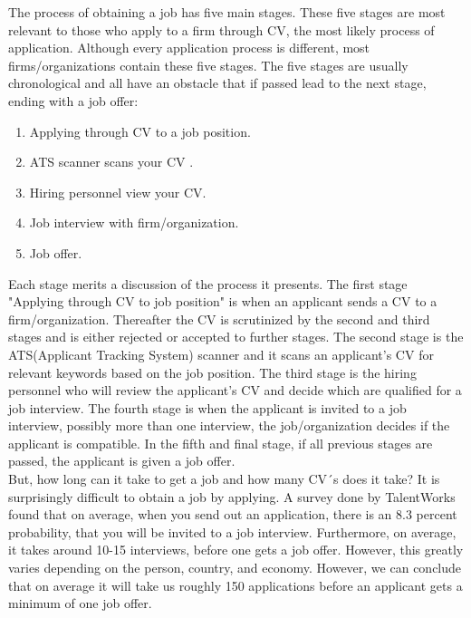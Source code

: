 The process of obtaining a job has five main stages.
These five stages are most relevant to those who apply to a firm through CV, the most likely process of application.
Although every application process is different, most firms/organizations contain these five stages.
The five stages are usually chronological and all have an obstacle that if passed lead to the next stage, ending with a job offer:
\begin{enumerate} 
   \item Applying through CV to a job position.
   \item ATS scanner scans your CV \cite{ATS-scanner}.
   \item Hiring personnel view your CV.
   \item Job interview with firm/organization.
   \item Job offer.\cite{Process_steps_unemployment}
\end{enumerate} \label{Five_stages_of_obtaining_a_job}
Each stage merits a discussion of the process it presents.
The first stage "Applying through CV to job position" is when an applicant sends a CV to a firm/organization.
Thereafter the CV is scrutinized by the second and third stages and is either rejected or accepted to further stages.
The second stage is the ATS(Applicant Tracking System) scanner and it scans an applicant's CV for relevant keywords based on the job position.
The third stage is the hiring personnel who will review the applicant's CV and decide which are qualified for a job interview.
The fourth stage is when the applicant is invited to a job interview, possibly more than one interview, the job/organization decides if the applicant is compatible.
In the fifth and final stage, if all previous stages are passed, the applicant is given a job offer. \\
 
But, how long can it take to get a job and how many CV´s does it take?
It is surprisingly difficult to obtain a job by applying.
A survey done by TalentWorks found that on average, when you send out an application, there is an 8.3 percent probability, that you will be invited to a job interview. 
Furthermore, on average, it takes around 10-15 interviews, before one gets a job offer. 
However, this greatly varies depending on the person, country, and economy.
However, we can conclude that on average it will take us roughly 150 applications before an applicant gets a minimum of one job offer.\cite{HR-sales} \\


